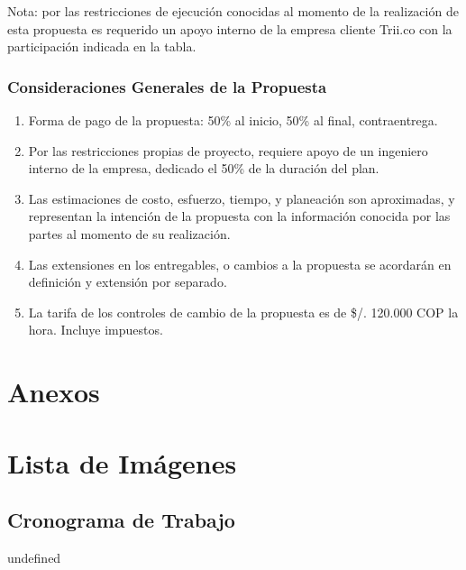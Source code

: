 \documentclass[
  paper=a4,
  ,captions=tableheading
]{scrartcl}
\providecommand{\tightlist}{%
  \setlength{\itemsep}{0pt}\setlength{\parskip}{0pt}}
\renewenvironment{quote}{\begin{customblockquote}\list{}{\rightmargin=0em\leftmargin=0em}%
\item\relax\color{blockquote-text}\ignorespaces}{\unskip\unskip\endlist\end{customblockquote}}
\begin{document}
Nota: por las restricciones de ejecución conocidas al momento de la
realización de esta propuesta es requerido un apoyo interno de la
empresa cliente Trii.co con la participación indicada en la tabla.

\subsubsection{Consideraciones Generales de la
Propuesta}\label{sec:consideraciones-generales-de-la-propuesta}

\begin{enumerate}
\def\labelenumi{\arabic{enumi}.}
\tightlist
\item
  Forma de pago de la propuesta: 50\% al inicio, 50\% al final,
  contraentrega.
\item
  Por las restricciones propias de proyecto, requiere apoyo de un
  ingeniero interno de la empresa, dedicado el 50\% de la duración del
  plan.
\item
  Las estimaciones de costo, esfuerzo, tiempo, y planeación son
  aproximadas, y representan la intención de la propuesta con la
  información conocida por las partes al momento de su realización.
\item
  Las extensiones en los entregables, o cambios a la propuesta se
  acordarán en definición y extensión por separado.
\item
  La tarifa de los controles de cambio de la propuesta es de \$/.
  120.000 COP la hora. Incluye impuestos.
\end{enumerate}

\newpage

\section{Anexos}\label{sec:anexos}

\newpage

\section{Lista de Imágenes}\label{sec:lista-de-imuxe1genes}

\subsection{Cronograma de Trabajo}\label{sec:cronograma-de-trabajo}

\begin{quote}
undefined
\end{quote}
\end{document}
